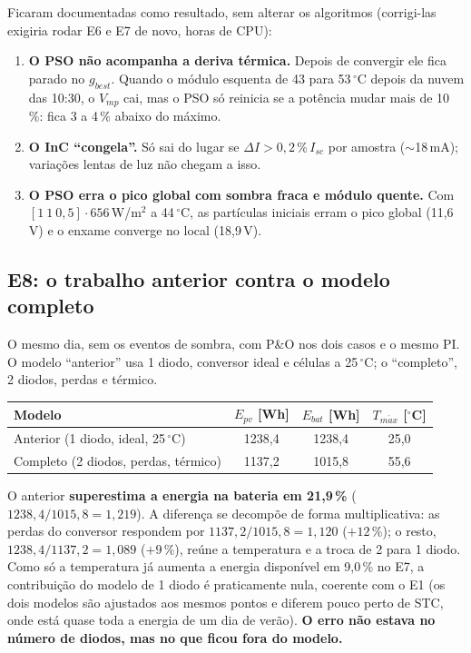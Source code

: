 Ficaram documentadas como resultado, sem alterar os algoritmos (corrigi-las exigiria rodar E6 e E7 de novo, horas de CPU):
\begin{enumerate}
\item \textbf{O PSO n\~ao acompanha a deriva t\'ermica.} Depois de convergir ele fica parado no $g_{best}$. Quando o m\'odulo esquenta de 43 para 53\,$^\circ$C depois da nuvem das 10:30, o $V_{mp}$ cai, mas o PSO s\'o reinicia se a pot\^encia mudar mais de 10\,\%: fica 3 a 4\,\% abaixo do m\'aximo.
\item \textbf{O InC ``congela''.} S\'o sai do lugar se $\Delta I>0{,}2\,\%\,I_{sc}$ por amostra ($\sim$18\,mA); varia\c{c}\~oes lentas de luz n\~ao chegam a isso.
\item \textbf{O PSO erra o pico global com sombra fraca e m\'odulo quente.} Com $[1\ 1\ 0{,}5]\cdot656$\,W/m$^2$ a 44\,$^\circ$C, as part\'iculas iniciais erram o pico global (11,6\,V) e o enxame converge no local (18,9\,V).
\end{enumerate}

\subsection{E8: o trabalho anterior contra o modelo completo}\label{sec:e8}

O mesmo dia, sem os eventos de sombra, com P\&O nos dois casos e o mesmo PI. O modelo ``anterior'' usa 1 diodo, conversor ideal e c\'elulas a 25\,$^\circ$C; o ``completo'', 2 diodos, perdas e t\'ermico.

\begin{resultado}
\small\centering
\begin{tabular}{@{}lccc@{}}
\toprule
Modelo & $E_{pv}$ [Wh] & $E_{bat}$ [Wh] & $T_{m\acute ax}$ [$^\circ$C] \\ \midrule
Anterior (1 diodo, ideal, 25\,$^\circ$C) & 1238,4 & 1238,4 & 25,0 \\
Completo (2 diodos, perdas, t\'ermico) & 1137,2 & 1015,8 & 55,6 \\
\bottomrule
\end{tabular}
\end{resultado}

O anterior \textbf{superestima a energia na bateria em 21,9\,\%} ($1238{,}4/1015{,}8=1{,}219$). A diferen\c{c}a se decomp\~oe de forma multiplicativa: as perdas do conversor respondem por
$1137{,}2/1015{,}8=1{,}120$ ($+12$\,\%); o resto, $1238{,}4/1137{,}2=1{,}089$ ($+9$\,\%), re\'une a temperatura e a troca de 2 para 1 diodo. Como s\'o a temperatura j\'a aumenta a energia
dispon\'ivel em 9,0\,\% no E7, a contribui\c{c}\~ao do modelo de 1 diodo \'e praticamente nula, coerente com o E1 (os dois modelos s\~ao ajustados aos mesmos pontos e diferem pouco perto de STC, onde est\'a quase toda a energia de um dia de ver\~ao).
\textbf{O erro n\~ao estava no n\'umero de diodos, mas no que ficou fora do modelo.}

